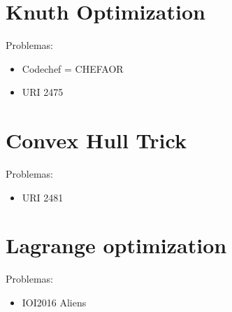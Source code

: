 \section{Knuth Optimization}
Problemas:
\begin{itemize}
	\item Codechef = CHEFAOR
	\item URI 2475
\end{itemize}

\section{Convex Hull Trick}
Problemas:
\begin{itemize}
	\item URI 2481
\end{itemize}

\section{Lagrange optimization}
Problemas:
\begin{itemize}
	\item IOI2016 Aliens
\end{itemize}